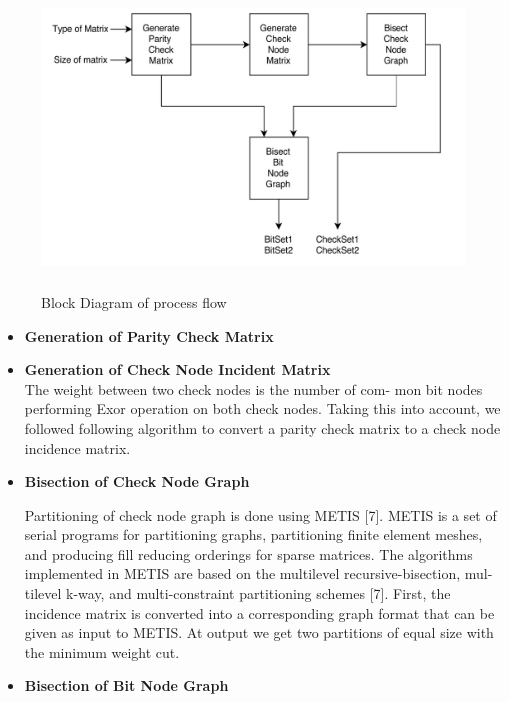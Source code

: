 \documentclass[twopage,12pt,a4paper]{report}
\begin{document}
\begin{raggedright}
 \begin{figure}[h]
 \begin{center}
    \includegraphics[height=8cm,width=14cm]{partition2.jpg}
    \caption{Block Diagram of process flow} 
 \end{center}
\end{figure}  

\begin{itemize}
\item \textbf{Generation of Parity Check Matrix}
\item \textbf{Generation of Check Node Incident Matrix} \\
The weight between two check nodes is the number of com-
mon bit nodes performing Exor operation on both check nodes.
Taking this into account, we followed following algorithm to
convert a parity check matrix to a check node incidence matrix.

\item \textbf{Bisection of Check Node Graph}

Partitioning of check node graph is done using METIS [7].
METIS is a set of serial programs for partitioning graphs,
partitioning finite element meshes, and producing fill reducing
orderings for sparse matrices. The algorithms implemented in
METIS are based on the multilevel recursive-bisection, mul-
tilevel k-way, and multi-constraint partitioning schemes [7].
First, the incidence matrix is converted into a corresponding
graph format that can be given as input to METIS. At output
we get two partitions of equal size with the minimum weight
cut.

\item \textbf{Bisection of Bit Node Graph}


\end{itemize}
\end{raggedright}
\end{document}
